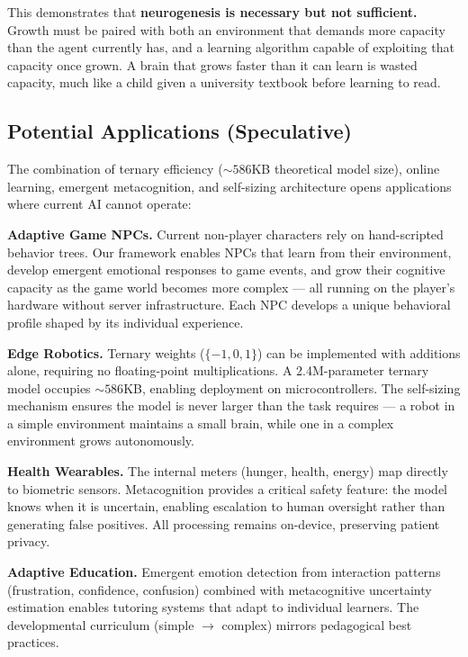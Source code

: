 \documentclass{article}
\begin{document}
This demonstrates that \textbf{neurogenesis is necessary but not sufficient.} Growth must be paired with both an environment that demands more capacity than the agent currently has, and a learning algorithm capable of exploiting that capacity once grown. A brain that grows faster than it can learn is wasted capacity, much like a child given a university textbook before learning to read.

\subsection{Potential Applications (Speculative)}
The combination of ternary efficiency ($\sim 586$KB theoretical model size), online learning, emergent metacognition, and self-sizing architecture opens applications where current AI cannot operate:

\textbf{Adaptive Game NPCs.} Current non-player characters rely on hand-scripted behavior trees. Our framework enables NPCs that learn from their environment, develop emergent emotional responses to game events, and grow their cognitive capacity as the game world becomes more complex --- all running on the player's hardware without server infrastructure. Each NPC develops a unique behavioral profile shaped by its individual experience.

\textbf{Edge Robotics.} Ternary weights ($\{-1, 0, 1\}$) can be implemented with additions alone, requiring no floating-point multiplications. A 2.4M-parameter ternary model occupies $\sim 586$KB, enabling deployment on microcontrollers. The self-sizing mechanism ensures the model is never larger than the task requires --- a robot in a simple environment maintains a small brain, while one in a complex environment grows autonomously.

\textbf{Health Wearables.} The internal meters (hunger, health, energy) map directly to biometric sensors. Metacognition provides a critical safety feature: the model knows when it is uncertain, enabling escalation to human oversight rather than generating false positives. All processing remains on-device, preserving patient privacy.

\textbf{Adaptive Education.} Emergent emotion detection from interaction patterns (frustration, confidence, confusion) combined with metacognitive uncertainty estimation enables tutoring systems that adapt to individual learners. The developmental curriculum (simple $\rightarrow$ complex) mirrors pedagogical best practices.
\end{document}
